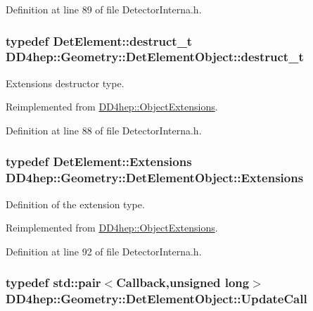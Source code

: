 Definition at line 89 of file DetectorInterna.h.\hypertarget{class_d_d4hep_1_1_geometry_1_1_det_element_object_af4773c2a725fc7076297670a7ae1ac41}{
\subsubsection[{destruct\_\-t}]{\setlength{\rightskip}{0pt plus 5cm}typedef {\bf DetElement::destruct\_\-t} {\bf DD4hep::Geometry::DetElementObject::destruct\_\-t}}}
\label{class_d_d4hep_1_1_geometry_1_1_det_element_object_af4773c2a725fc7076297670a7ae1ac41}


Extensions destructor type. 

Reimplemented from \hyperlink{class_d_d4hep_1_1_object_extensions_af9ca2813f0d7fa65ac13d905d9721cdf}{DD4hep::ObjectExtensions}.

Definition at line 88 of file DetectorInterna.h.\hypertarget{class_d_d4hep_1_1_geometry_1_1_det_element_object_ac74df66a49fc20d985f033a063b7dbab}{
\subsubsection[{Extensions}]{\setlength{\rightskip}{0pt plus 5cm}typedef {\bf DetElement::Extensions} {\bf DD4hep::Geometry::DetElementObject::Extensions}}}
\label{class_d_d4hep_1_1_geometry_1_1_det_element_object_ac74df66a49fc20d985f033a063b7dbab}


Definition of the extension type. 

Reimplemented from \hyperlink{class_d_d4hep_1_1_object_extensions_a882c1e22567a450f60d83eb735dd3532}{DD4hep::ObjectExtensions}.

Definition at line 92 of file DetectorInterna.h.\hypertarget{class_d_d4hep_1_1_geometry_1_1_det_element_object_a3b316c36c1b168152e4c96a42ca561aa}{
\subsubsection[{UpdateCall}]{\setlength{\rightskip}{0pt plus 5cm}typedef std::pair$<${\bf Callback},unsigned long$>$ {\bf DD4hep::Geometry::DetElementObject::UpdateCall}}}
\label{class_d_d4hep_1_1_geometry_1_1_det_element_object_a3b316c36c1b168152e4c96a42ca561aa}


